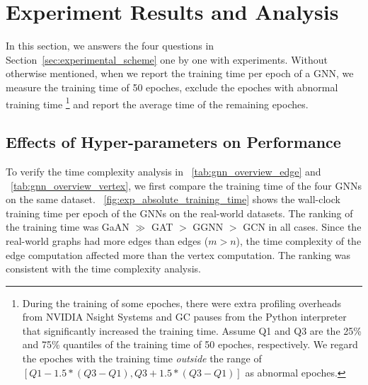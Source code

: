 \section{Experiment Results and Analysis}
\label{sec:experiment_results}

In this section, we answers the four questions in Section~\ref{sec:experimental_scheme} one by one with experiments.
Without otherwise mentioned, when we report the training time per epoch of a GNN, we measure the training time of 50 epoches, exclude the epoches with abnormal training time \footnote{During the training of some epoches, there were extra profiling overheads from NVIDIA Nsight Systems and GC pauses from the Python interpreter that significantly increased the training time. Assume Q1 and Q3 are the 25\% and 75\% quantiles of the training time of 50 epoches, respectively. We regard the epoches with the training time \emph{outside} the range of $[Q1 - 1.5 * (Q3-Q1), Q3 + 1.5 * (Q3-Q1)]$ as abnormal epoches.} and report the average time of the remaining epoches.

\subsection{Effects of Hyper-parameters on Performance}
\label{sec:effects_of_hyper-parameters_on_performance}

To verify the time complexity analysis in \tablename~\ref{tab:gnn_overview_edge} and \tablename~\ref{tab:gnn_overview_vertex}, we first compare the training time of the four GNNs on the same dataset.
\figurename~\ref{fig:exp_absolute_training_time} shows the wall-clock training time per epoch of the GNNs on the real-world datasets.
The ranking of the training time was GaAN $\gg$ GAT $>$ GGNN $>$ GCN in all cases.
Since the real-world graphs had more edges than edges ($m > n$), the time complexity of the edge computation affected more than the vertex computation.
The ranking was consistent with the time complexity analysis.

